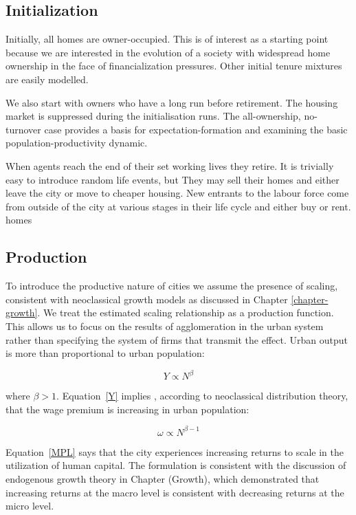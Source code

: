\subsection{Initialization}
Initially, all homes are owner-occupied. This is of interest  as a starting point because we are interested in the evolution of a society with widespread home ownership in the face of financialization pressures. Other initial tenure mixtures are easily modelled.

We also start with owners who have a long run before retirement. The housing market is suppressed during the initialisation runs. The all-ownership, no-turnover case provides a basis for expectation-formation and examining the basic population-productivity dynamic. 


When agents reach the end of their set working lives they retire. It is trivially easy to introduce random life events, but  They may sell their homes and either leave the city or move to cheaper housing.  New entrants to the labour force come from outside of the city at various stages in their life cycle and either buy or rent. homes 



\subsection{Production}
To introduce  the productive nature of cities we  assume the presence of scaling, consistent with neoclassical growth models as discussed in Chapter \ref{chapter-growth}. We treat the estimated scaling relationship as a production function. This allows us to focus on the results of agglomeration in the urban system rather than specifying the system of firms  that transmit the effect. Urban output is more than proportional to urban population: 

 \begin{equation}
 Y\propto N^{\beta} \label{Y}
 \end{equation}

where $\beta >1$.  Equation~\ref{Y} implies , according to neoclassical distribution theory, that the wage premium is increasing in urban  population:

\begin{equation}
\omega\propto N^{\beta-1} \label{MPL}
\end{equation}

Equation~\ref{MPL} says that the city experiences increasing returns to scale in the utilization of human capital. The formulation is  consistent with the discussion of endogenous growth theory in Chapter (Growth), which demonstrated that increasing returns at the macro level is consistent with decreasing returns at the micro level. 

